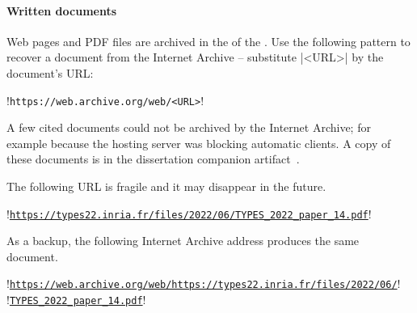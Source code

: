 \paragraph*{Written documents}
Web pages and PDF files are archived in the  of the
. Use the following pattern to recover a document from the
Internet Archive -- substitute \pr|<URL>| by the document's URL\@:

\begin{minipage}{\textwidth}
\begin{browserlisting}
!\texttt{https://web.archive.org/web/<URL>}!
\end{browserlisting}
\end{minipage}

A few cited documents could not be archived by the Internet Archive; for example
because the hosting server was blocking automatic clients. A copy of these
documents is in the dissertation companion artifact~\cite{aicc}.

\begin{example}

The following URL is fragile and it may disappear in the future.

\begin{minipage}{\textwidth}
\begin{browserlisting}
!\texttt{\url{https://types22.inria.fr/files/2022/06/TYPES_2022_paper_14.pdf}}!
\end{browserlisting}
\end{minipage}

As a backup, the following Internet Archive address produces the same document.

\begin{minipage}{\textwidth}
\begin{browserlisting}
!\texttt{\href{https://web.archive.org/web/https://types22.inria.fr/files/2022/06/}{https://web.archive.org/web/https://types22.inria.fr/files/2022/06/}}!
!\hspace{2em}\texttt{\href{https://web.archive.org/web/https://types22.inria.fr/files/2022/06/TYPES_2022_paper_14.pdf}{TYPES\_2022\_paper\_14.pdf}}!
\end{browserlisting}
\end{minipage}
\end{example}